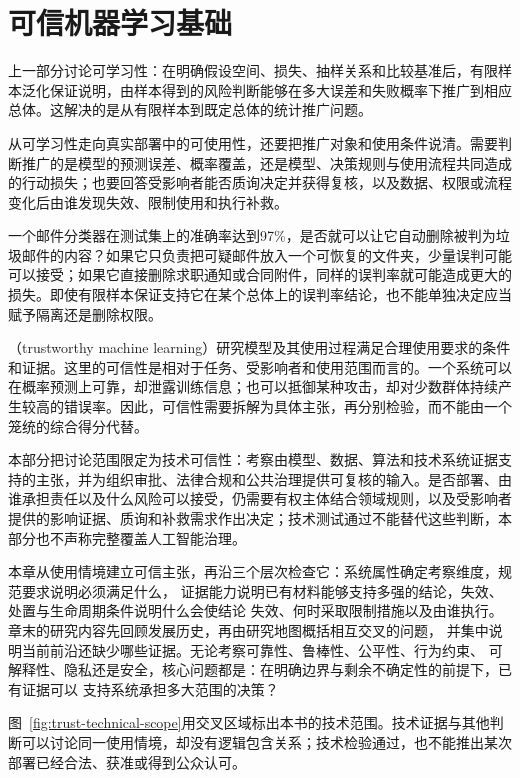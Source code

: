 \chapter{可信机器学习基础}
\label{chap:trust-foundations}

上一部分讨论可学习性：在明确假设空间、损失、抽样关系和比较基准后，有限样本泛化保证说明，由样本得到的风险判断能够在多大误差和失败概率下推广到相应总体。这解决的是从有限样本到既定总体的统计推广问题。

从可学习性走向真实部署中的可使用性，还要把推广对象和使用条件说清。需要判断推广的是模型的预测误差、概率覆盖，还是模型、决策规则与使用流程共同造成的行动损失；也要回答受影响者能否质询决定并获得复核，以及数据、权限或流程变化后由谁发现失效、限制使用和执行补救。

一个邮件分类器在测试集上的准确率达到97\%，是否就可以让它自动删除被判为垃圾邮件的内容？如果它只负责把可疑邮件放入一个可恢复的文件夹，少量误判可能可以接受；如果它直接删除求职通知或合同附件，同样的误判率就可能造成更大的损失。即使有限样本保证支持它在某个总体上的误判率结论，也不能单独决定应当赋予隔离还是删除权限。

（trustworthy machine learning）研究模型及其使用过程满足合理使用要求的条件和证据。这里的可信性是相对于任务、受影响者和使用范围而言的。一个系统可以在概率预测上可靠，却泄露训练信息；也可以抵御某种攻击，却对少数群体持续产生较高的错误率。因此，可信性需要拆解为具体主张，再分别检验，而不能由一个笼统的综合得分代替。

本部分把讨论范围限定为技术可信性：考察由模型、数据、算法和技术系统证据支持的主张，并为组织审批、法律合规和公共治理提供可复核的输入。是否部署、由谁承担责任以及什么风险可以接受，仍需要有权主体结合领域规则，以及受影响者提供的影响证据、质询和补救需求作出决定；技术测试通过不能替代这些判断，本部分也不声称完整覆盖人工智能治理。

本章从使用情境建立可信主张，再沿三个层次检查它：系统属性确定考察维度，规范要求说明必须满足什么，
证据能力说明已有材料能够支持多强的结论，失效、处置与生命周期条件说明什么会使结论
失效、何时采取限制措施以及由谁执行。章末的研究内容先回顾发展历史，再由研究地图概括相互交叉的问题，
并集中说明当前前沿还缺少哪些证据。无论考察可靠性、鲁棒性、公平性、行为约束、
可解释性、隐私还是安全，核心问题都是：在明确边界与剩余不确定性的前提下，已有证据可以
支持系统承担多大范围的决策？

图~\ref{fig:trust-technical-scope}用交叉区域标出本书的技术范围。技术证据与其他判断可以讨论同一使用情境，却没有逻辑包含关系；技术检验通过，也不能推出某次部署已经合法、获准或得到公众认可。

